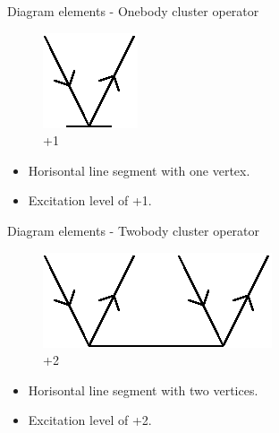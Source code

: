 \begin{frame}{Diagram elements - Onebody cluster operator}

    \renewcommand{\figurename}{Level}

    \begin{figure}
    \centering
    \parbox{0.20\textwidth}{
            \centering
            \includegraphics[scale=0.65]{graphics/t1}
            \caption{+1}
        }
    \end{figure}

    \begin{itemize}
        \item Horisontal line segment with one vertex.
        \item Excitation level of +1.
    \end{itemize}
\end{frame}

\begin{frame}{Diagram elements - Twobody cluster operator}

    \renewcommand{\figurename}{Level}

    \begin{figure}
    \centering
    \parbox{0.20\textwidth}{
            \centering
            \includegraphics[scale=0.65]{graphics/t2}
            \caption{+2}
        }
    \end{figure}

    \begin{itemize}
        \item Horisontal line segment with two vertices.
        \item Excitation level of +2.
    \end{itemize}
\end{frame}


